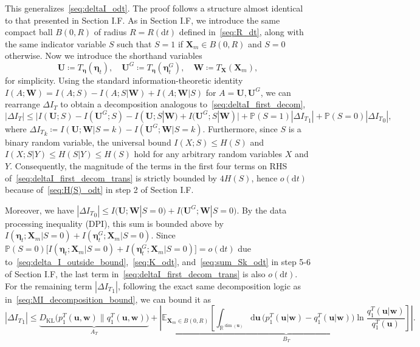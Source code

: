 This generalizes~\eqref{seq:deltaI_odt}. The proof follows a structure almost identical to that presented in Section I.F. As in Section I.F, we introduce the same compact ball $B(0,R)$ of radius $R=R(\mathrm dt)$ defined in~\eqref{seq:R_dt}, along with the same indicator variable $S$ such that $S=1$ if $\bm X_m\in B(0,R)$ and $S=0$ otherwise. 
Now we introduce the shorthand variables
\[
    \bm U\coloneq T_{\bm\eta}(\bm\eta_t),
    \quad
    \bm U^G\coloneq T_{\bm\eta}(\bm\eta_t^G),
    \quad
    \bm W\coloneq T_{\bm X}(\bm X_m),
\]
for simplicity. Using the standard information-theoretic identity $I(A;\bm W)=I(A;S)-I(A;S|\bm W)+I(A;\bm W|S)$ for $A=\bm U, \bm U^G$, we can rearrange $\Delta I_T$ to obtain a decomposition analogous to~\eqref{seq:deltaI_first_decom},
\begin{equation}
    |\Delta I_T| \le
    \big| I(\bm U; S) - I(\bm U^G; S) 
    - I(\bm U; S|\bm W) + I(\bm U^G; S|\bm W)\big|
    + \mathbb P(S=1)|\Delta {I_T}_1| + \mathbb P(S=0)|\Delta {I_T}_0|,
    \label{seq:deltaI_first_decom_trans}
\end{equation}
where $\Delta {I_T}_k\coloneq I(\bm U;\bm W|S=k)-I(\bm U^G;\bm W|S=k)$. Furthermore, since $S$ is a binary random variable, the universal bound $I(X;S)\leq H(S)$ and $I(X;S|Y)\leq H(S|Y)\leq H(S)$ hold for any arbitrary random variables $X$ and $Y$. Consequently, the magnitude of the terms in the first four terms on RHS of~\eqref{seq:deltaI_first_decom_trans} is strictly bounded by $4H(S)$, hence $o(\mathrm dt)$ because of~\eqref{seq:H(S)_odt} in step 2 of Section I.F.

Moreover, we have $|\Delta {I_T}_0|\le I\big(\bm U;\bm W|S=0\big) + I\big(\bm U^G;\bm W|S=0\big)$. By the data processing inequality (DPI), this sum is bounded above by $I(\bm\eta_t;\bm X_m|S=0) + I(\bm\eta_t^G;\bm X_m|S=0)$. Since $\mathbb P(S=0)\big[I(\bm\eta_t;\bm X_m|S=0)+I(\bm\eta_t^G;\bm X_m|S=0)\big] = o(\mathrm dt)$ due to~\eqref{seq:delta_I_outside_bound},~\eqref{seq:K_odt}, and~\eqref{seq:sum_Sk_odt} in step 5-6 of Section I.F, the last term in~\eqref{seq:deltaI_first_decom_trans} is also $o(\mathrm dt)$. For the remaining term $|\Delta {I_T}_1|$, following the exact same decomposition logic as in~\eqref{seq:MI_decomposition_bound}, we can bound it as
\begin{equation}
    |\Delta {I_T}_1| \leq 
    \underbrace{
    D_{\mathrm{KL}}\big(p_1^T(\bm u,\bm w)\|q_1^T(\bm u,\bm w)\big) }_{A_T}
    + \underbrace{
    \left|\mathbb E_{\bm X_m\in B(0,R)}\!\!\left[
    \int_{\mathbb R^{\dim(\bm u)}}\!\mathrm d\bm u\,\big(p_1^T(\bm u|\bm w)-q_1^T(\bm u|\bm w)\big)
    \ln\frac{q_1^T(\bm u|\bm w)}{q_1^T(\bm u)}\right]\right|}
    _{B_T}.
    \label{seq:MI_decomposition_bound_trans}
\end{equation}

